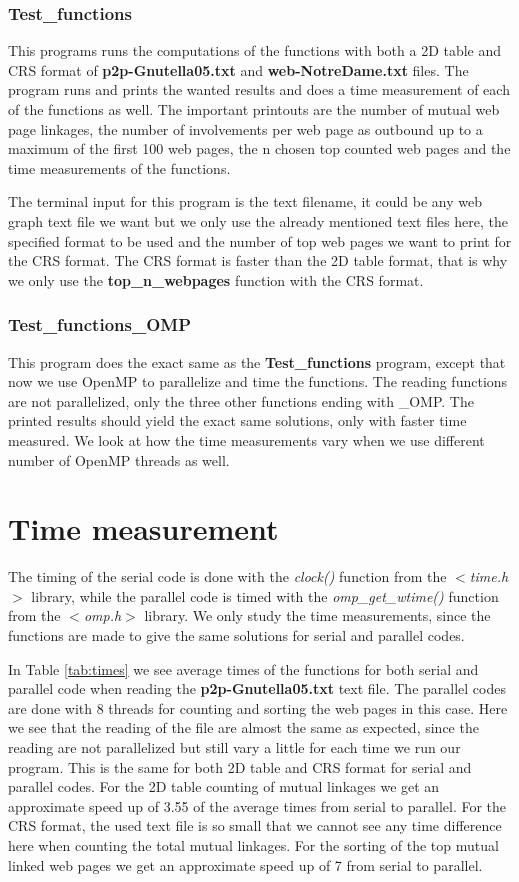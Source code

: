 \documentclass[12pt,a4paper,english]{article}
\begin{document}
\subsubsection{Test\_functions}
This programs runs the computations of the functions with both a 2D table and CRS format of \textbf{p2p-Gnutella05.txt} and \textbf{web-NotreDame.txt} files. The program runs and prints the wanted results and does a time measurement of each of the functions as well. The important printouts are the number of mutual web page linkages, the number of involvements per web page as outbound up to a maximum of the first 100 web pages, the n chosen top counted web pages and the time measurements of the functions.

The terminal input for this program is the text filename, it could be any web graph text file we want but we only use the already mentioned text files here, the specified format to be used and the number of top web pages we want to print for the CRS format. The CRS format is faster than the 2D table format, that is why we only use the \textbf{top\_n\_webpages} function with the CRS format.

\subsubsection{Test\_functions\_OMP}
This program does the exact same as the \textbf{Test\_functions} program, except that now we use OpenMP to parallelize and time the functions. The reading functions are not parallelized, only the three other functions ending with \_OMP. The printed results should yield the exact same solutions, only with faster time measured. We look at how the time measurements vary when we use different number of OpenMP threads as well. 

\section{Time measurement}
\label{sect:Time}
The timing of the serial code is done with the \textit{clock()} function from the \textit{$<$time.h$>$} library, while the parallel code is timed with the \textit{omp\_get\_wtime()} function from the \textit{$<$omp.h$>$} library. We only study the time measurements, since the functions are made to give the same solutions for serial and parallel codes.

In Table \ref{tab:times} we see average times of the functions for both serial and parallel code when reading the \textbf{p2p-Gnutella05.txt} text file. The parallel codes are done with 8 threads for counting and sorting the web pages in this case. Here we see that the reading of the file are almost the same as expected, since the reading are not parallelized but still vary a little for each time we run our program. This is the same for both 2D table and CRS format for serial and parallel codes. For the 2D table counting of mutual linkages we get an approximate speed up of 3.55 of the average times from serial to parallel. For the CRS format, the used text file is so small that we cannot see any time difference here when counting the total mutual linkages. For the sorting of the top mutual linked web pages we get an approximate speed up of 7 from serial to parallel.
\end{document}
